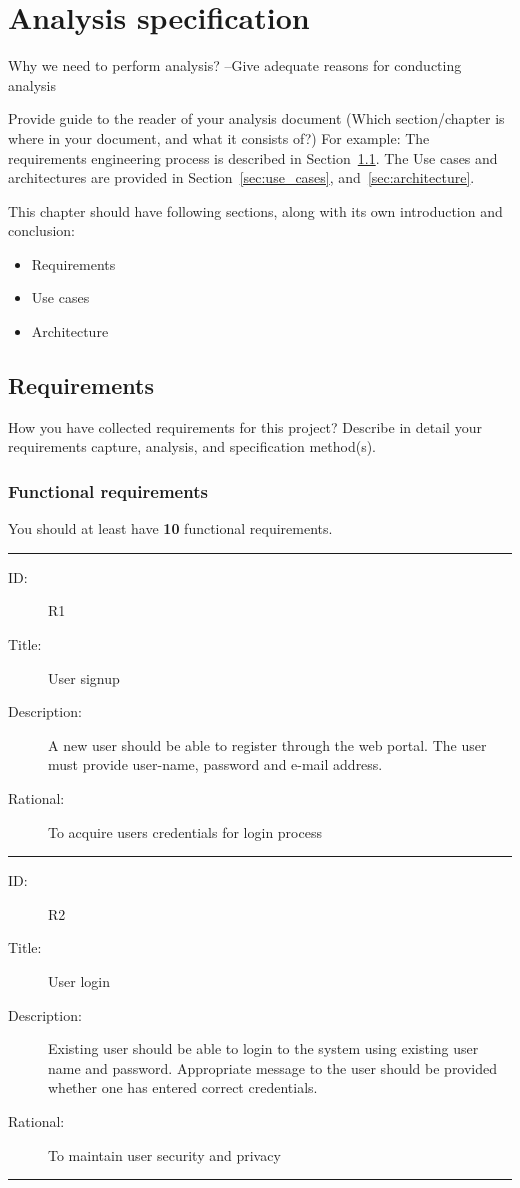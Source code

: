 \chapter{Analysis specification} %
\label{cha:analysis}

Why we need to perform analysis? --Give adequate reasons for conducting analysis

Provide guide to the reader of your analysis document (Which section/chapter is where in your document, and what it consists of?) For example: The requirements engineering process is described in Section~\ref{sec:requirements}. The Use cases and architectures are provided in Section~\ref{sec:use_cases}, and~\ref{sec:architecture}.

This chapter should have following sections, along with its own introduction and conclusion:
\begin{itemize}
  \item Requirements
  \item Use cases
  \item Architecture
\end{itemize}

\section{Requirements} %
\label{sec:requirements}

How you have collected requirements for this project? Describe in detail your requirements capture, analysis, and specification method(s). 

\subsection{Functional requirements} %
\label{sub:functional_requirements}

You should at least have \textbf{10} functional requirements.

\hrule
\begin{description}
	\item[ID:] R1
	\item[Title:] User signup
	\item[Description:] A new user should be able to register through the web portal. The user must provide user-name, password and e-mail address.
	\item[Rational:] To acquire users credentials for login process
\end{description}
\hrule
\begin{description}
	\item[ID:] R2
	\item[Title:] User login
	\item[Description:] Existing user should be able to login to the system using existing user name and password. Appropriate message to the user should be provided whether one has entered correct credentials.
	\item[Rational:] To maintain user security and privacy
\end{description}
\hrule

